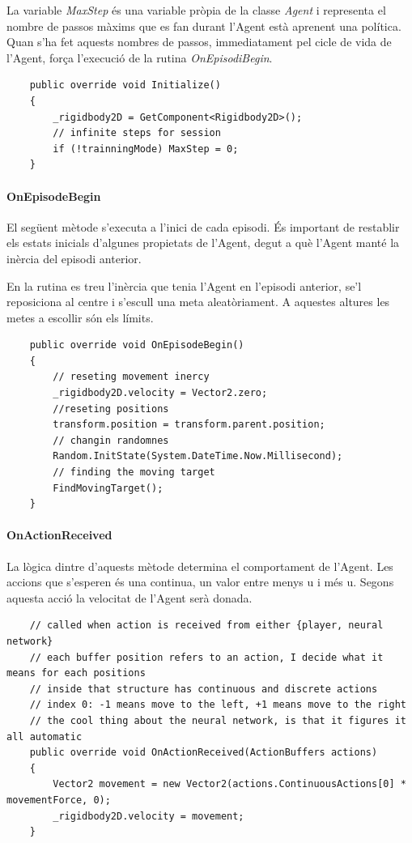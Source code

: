 \documentclass{article}
\begin{document}
    La variable \textit{MaxStep} és una variable pròpia de la classe \textit{Agent} i representa el nombre de passos màxims que es fan durant l'Agent està aprenent una política. Quan s'ha fet aquests nombres de passos, immediatament pel cicle de vida de l'Agent, força l'execució de la rutina \textit{OnEpisodiBegin}. \\
    
    \begin{lstlisting}
    public override void Initialize()
    {
        _rigidbody2D = GetComponent<Rigidbody2D>();
        // infinite steps for session
        if (!trainningMode) MaxStep = 0;
    }
    \end{lstlisting}
    
    
    \newpage
    
    \paragraph{OnEpisodeBegin}
    
    El següent mètode s'executa a l'inici de cada episodi. És important de restablir els estats inicials d'algunes propietats de l'Agent, degut a què l'Agent manté la inèrcia del episodi anterior.

    En la rutina es treu l'inèrcia que tenia l'Agent en l'episodi anterior, se'l reposiciona al centre i s'escull una meta aleatòriament. A aquestes altures les metes a escollir són els límits.
    
    \begin{lstlisting}
    public override void OnEpisodeBegin()
    {
        // reseting movement inercy
        _rigidbody2D.velocity = Vector2.zero;
        //reseting positions
        transform.position = transform.parent.position;
        // changin randomnes
        Random.InitState(System.DateTime.Now.Millisecond);
        // finding the moving target
        FindMovingTarget();
    }
    \end{lstlisting}
    
    \paragraph{OnActionReceived}
    
    La lògica dintre d'aquests mètode determina el comportament de l'Agent.
    Les accions que s'esperen és una continua, un valor entre menys u i més u. Segons aquesta acció la velocitat de l'Agent serà donada.
    
    \begin{lstlisting}
    // called when action is received from either {player, neural network}
    // each buffer position refers to an action, I decide what it means for each positions
    // inside that structure has continuous and discrete actions
    // index 0: -1 means move to the left, +1 means move to the right
    // the cool thing about the neural network, is that it figures it all automatic
    public override void OnActionReceived(ActionBuffers actions)
    {
        Vector2 movement = new Vector2(actions.ContinuousActions[0] * movementForce, 0);
        _rigidbody2D.velocity = movement;
    }
    \end{lstlisting}
    
\end{document}
